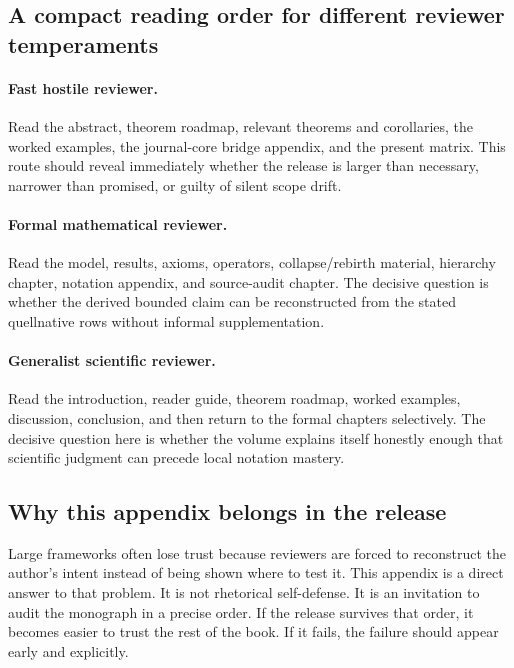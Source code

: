 \subsection{A compact reading order for different reviewer temperaments}

\paragraph{Fast hostile reviewer.}
Read the abstract, theorem roadmap, relevant theorems and corollaries, the worked examples,
the journal-core bridge appendix, and the present matrix. This route should reveal immediately
whether the release is larger than necessary, narrower than promised, or guilty of silent scope
drift.

\paragraph{Formal mathematical reviewer.}
Read the model, results, axioms, operators, collapse/rebirth material, hierarchy chapter,
notation appendix, and source-audit chapter. The decisive question is whether the derived bounded
claim can be reconstructed from the stated quellnative rows without informal supplementation.

\paragraph{Generalist scientific reviewer.}
Read the introduction, reader guide, theorem roadmap, worked examples, discussion, conclusion,
and then return to the formal chapters selectively. The decisive question here is whether the
volume explains itself honestly enough that scientific judgment can precede local notation
mastery.

\subsection{Why this appendix belongs in the release}

Large frameworks often lose trust because reviewers are forced to reconstruct the author's intent
instead of being shown where to test it. This appendix is a direct answer to that problem. It is
not rhetorical self-defense. It is an invitation to audit the monograph in a precise order.
If the release survives that order, it becomes easier to trust the rest of the book. If it fails,
the failure should appear early and explicitly.

\clearpage
